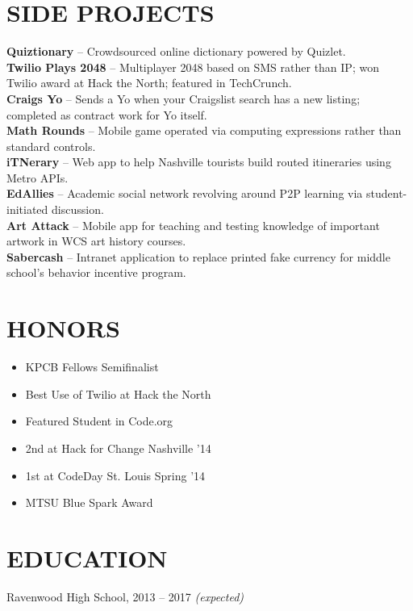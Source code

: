 \documentclass{res}
\begin{document}
\section{SIDE PROJECTS}

\textbf{Quiztionary} -- Crowdsourced online dictionary powered by Quizlet. \\
\textbf{Twilio Plays 2048} -- Multiplayer 2048 based on SMS rather than IP; won Twilio award at Hack the North; featured in TechCrunch. \\
\textbf{Craigs Yo} -- Sends a Yo when your Craigslist search has a new listing; completed as contract work for Yo itself. \\
\textbf{Math Rounds} -- Mobile game operated via computing expressions rather than standard controls. \\
\textbf{iTNerary} -- Web app to help Nashville tourists build routed itineraries using Metro APIs. \\
\textbf{EdAllies} -- Academic social network revolving around P2P learning via student-initiated discussion. \\
\textbf{Art Attack} -- Mobile app for teaching and testing knowledge of important artwork in WCS art history courses. \\
\textbf{Sabercash} -- Intranet application to replace printed fake currency for middle school's behavior incentive program.

\section{HONORS}

\begin{itemize} \itemsep -2pt
  \item KPCB Fellows Semifinalist
  \item Best Use of Twilio at Hack the North
  \item Featured Student in Code.org
  \item 2nd at Hack for Change Nashville '14
  \item 1st at CodeDay St. Louis Spring '14
  \item MTSU Blue Spark Award
\end{itemize}

\section{EDUCATION}

Ravenwood High School, 2013 -- 2017 \textit {(expected)}
\end{document}
